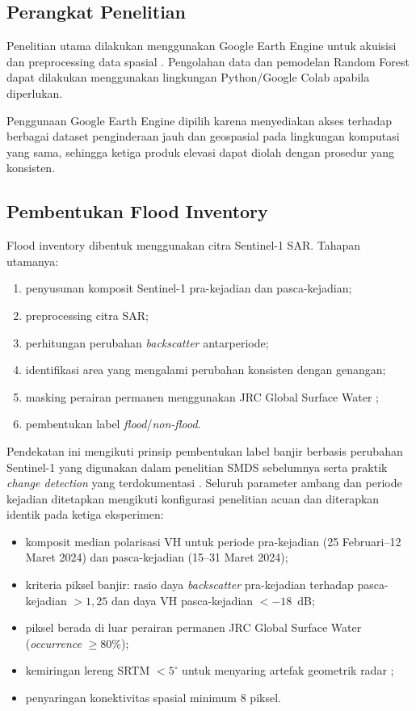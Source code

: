 \documentclass[12pt]{article}
\begin{document}
\subsection{Perangkat Penelitian}

Penelitian utama dilakukan menggunakan Google Earth Engine untuk akuisisi
dan preprocessing data spasial \cite{gorelick2017}. Pengolahan data dan
pemodelan Random Forest dapat dilakukan menggunakan lingkungan
Python/Google Colab apabila diperlukan.

Penggunaan Google Earth Engine dipilih karena menyediakan akses terhadap
berbagai dataset penginderaan jauh dan geospasial pada lingkungan komputasi
yang sama, sehingga ketiga produk elevasi dapat diolah dengan prosedur yang
konsisten.

\subsection{Pembentukan Flood Inventory}
\label{ssec:flood-inventory}

Flood inventory dibentuk menggunakan citra Sentinel-1 SAR. Tahapan utamanya:

\begin{enumerate}
\item penyusunan komposit Sentinel-1 pra-kejadian dan pasca-kejadian;
\item preprocessing citra SAR;
\item perhitungan perubahan \textit{backscatter} antarperiode;
\item identifikasi area yang mengalami perubahan konsisten dengan genangan;
\item masking perairan permanen menggunakan JRC Global Surface Water
\cite{pekel2016};
\item pembentukan label \textit{flood}/\textit{non-flood}.
\end{enumerate}

Pendekatan ini mengikuti prinsip pembentukan label banjir berbasis perubahan
Sentinel-1 yang digunakan dalam penelitian SMDS sebelumnya \cite{hakim2026}
serta praktik \textit{change detection} yang terdokumentasi
\cite{islammeng2022,unspider2024}. Seluruh parameter ambang dan periode
kejadian ditetapkan mengikuti konfigurasi penelitian acuan \cite{hakim2026}
dan diterapkan identik pada ketiga eksperimen:

\begin{itemize}
\item komposit median polarisasi VH untuk periode pra-kejadian
(25 Februari--12 Maret 2024) dan pasca-kejadian (15--31 Maret 2024);
\item kriteria piksel banjir: rasio daya \textit{backscatter} pra-kejadian
terhadap pasca-kejadian $>1{,}25$ dan daya VH pasca-kejadian $<-18$~dB;
\item piksel berada di luar perairan permanen JRC Global Surface Water
(\textit{occurrence} $\geq 80\%$);
\item kemiringan lereng SRTM $<5^{\circ}$ untuk menyaring artefak geometrik
radar \cite{hakim2026};
\item penyaringan konektivitas spasial minimum 8 piksel.
\end{itemize}
\end{document}

